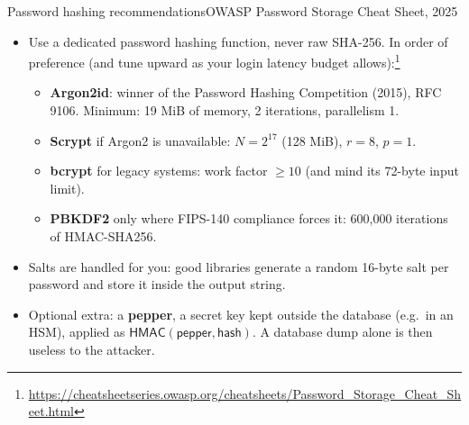 \ifdefined\PRESENTATION\else\PassOptionsToClass{handout}{beamer}\fi\documentclass[aspectratio=169, lualatex]{beamer}
\begin{document}
\begin{frame}{Password hashing recommendations}{OWASP Password Storage Cheat Sheet, 2025}
	\begin{itemize}
		\item Use a dedicated password hashing function, never raw SHA-256. In order of preference (and tune upward as your login latency budget allows):\footnote{\url{https://cheatsheetseries.owasp.org/cheatsheets/Password_Storage_Cheat_Sheet.html}}
		      \begin{itemize}
			      \item \textbf{Argon2id}: winner of the Password Hashing Competition (2015), RFC 9106. Minimum: 19 MiB of memory, 2 iterations, parallelism 1.
			      \item \textbf{Scrypt} if Argon2 is unavailable: $N = 2^{17}$ (128 MiB), $r = 8$, $p = 1$.
			      \item \textbf{bcrypt} for legacy systems: work factor $\geq 10$ (and mind its 72-byte input limit).
			      \item \textbf{PBKDF2} only where FIPS-140 compliance forces it: 600,000 iterations of HMAC-SHA256.
		      \end{itemize}
		\item Salts are handled for you: good libraries generate a random 16-byte salt per password and store it inside the output string.
		\item Optional extra: a \textbf{pepper}, a secret key kept outside the database (e.g.\ in an HSM), applied as $\mathsf{HMAC}(\mathsf{pepper}, \mathsf{hash})$. A database dump alone is then useless to the attacker.
	\end{itemize}
\end{frame}
\end{document}
